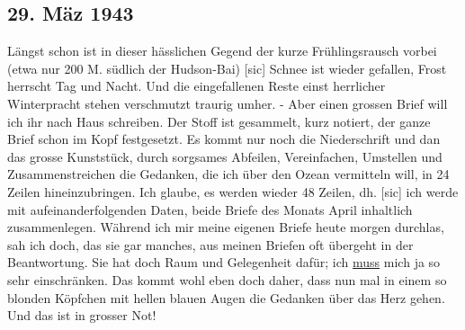 \subsection{29. M\"{a}z 1943}

L\"{a}ngst schon ist in dieser h\"{a}sslichen Gegend der kurze Fr\"{u}hlingsrausch vorbei (etwa nur 200 M. s\"{u}dlich der Hudson-Bai) {\color{red} [sic] }
Schnee ist wieder gefallen, Frost herrscht Tag und Nacht.
Und die eingefallenen Reste einst herrlicher Winterpracht stehen verschmutzt traurig umher.
- Aber einen grossen Brief will ich ihr nach Haus schreiben.
Der Stoff ist gesammelt, kurz notiert, der ganze Brief schon im Kopf festgesetzt.
Es kommt nur noch die Niederschrift und dan das grosse Kunstst\"{u}ck, durch sorgsames Abfeilen, Vereinfachen, Umstellen und Zusammenstreichen die Gedanken, die ich \"{u}ber den Ozean vermitteln will, in 24 Zeilen hineinzubringen.
Ich glaube, es werden wieder 48 Zeilen, dh.{\color{red} [sic] } ich werde mit aufeinanderfolgenden Daten, beide Briefe des Monats April inhaltlich zusammenlegen.
W\"{a}hrend ich mir meine eigenen Briefe heute morgen durchlas, sah ich doch, das sie gar manches, aus meinen Briefen oft \"{u}bergeht in der Beantwortung.
Sie hat doch Raum und Gelegenheit daf\"{u}r; ich \ul{muss} mich ja so sehr einschr\"{a}nken.
Das kommt wohl eben doch daher, dass nun mal in einem so blonden K\"{o}pfchen mit hellen blauen Augen die Gedanken \"{u}ber das Herz gehen.
Und das ist in grosser Not!
\clearpage
